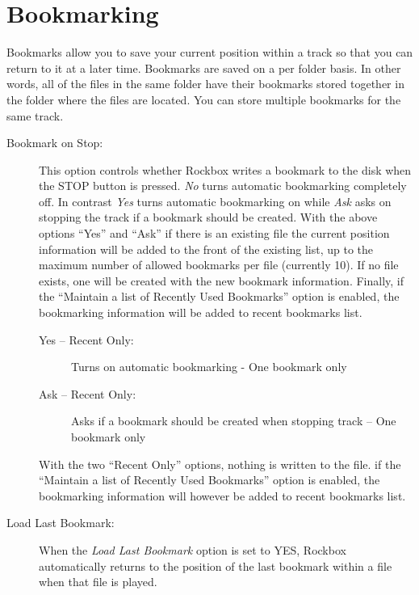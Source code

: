 \section{\label{ref:Bookmarkconfigactual}Bookmarking}
  Bookmarks allow you to save your current position within a track so that 
  you can return to it at a later time. Bookmarks are saved on a per folder
  basis. In other words, all of the files in the same folder have their
  bookmarks stored together in the folder where the files are located. You
  can store multiple bookmarks for the same track.
  \begin{description}
  \item [Bookmark on Stop: ]This option controls whether Rockbox writes a
    bookmark to the disk when the STOP button is pressed. 
    \emph{No} turns automatic bookmarking completely off. In contrast
    \emph{Yes} turns automatic bookmarking on while \emph{Ask} asks on stopping
    the track if a bookmark should be created.
    With the above options ``Yes'' and ``Ask'' if there is an existing 
     file the current position information will be added to the
    front of the existing list, up to the maximum number of allowed bookmarks
    per file (currently 10). If no  file exists, one will be
    created with the new bookmark information. Finally, if the ``Maintain 
    a list of Recently Used Bookmarks'' option is enabled, the bookmarking
    information will be added to recent bookmarks list.
    \begin{description}    
      \item[Yes -- Recent Only:]
            Turns on automatic bookmarking - One bookmark only
      \item[Ask -- Recent Only:]
            Asks if a bookmark should be created when stopping track -- 
            One bookmark only
    \end{description}
    With the two ``Recent Only'' options, nothing is written to the 
     file. if the ``Maintain a list of Recently Used Bookmarks''
    option is enabled, the bookmarking information will however be added to
    recent bookmarks list. 
    
  \item [Load Last Bookmark: ]

  When the \emph{Load Last Bookmark} option is set to YES, Rockbox
  automatically returns to the position of the last bookmark within a file
  when that file is played. 


\end{description}
